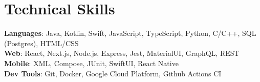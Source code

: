 \documentclass[letterpaper,11pt]{article}
\begin{document}
\section{Technical Skills}
\begin{itemize}[leftmargin=0.15in, label={}]
	\small{\item{
	      \textbf{Languages}{: Java, Kotlin, Swift, JavaScript, TypeScript, Python, C/C++, SQL (Postgres), HTML/CSS} \\
	      \textbf{Web}{: React, Next.js, Node.js, Express, Jest, MaterialUI, GraphQL, REST} \\
	      \textbf{Mobile}{: XML, Compose, JUnit, SwiftUI, React Native} \\
	      \textbf{Dev Tools}{: Git, Docker, Google Cloud Platform, Github Actions CI}
	      }}
\end{itemize}

\end{document}
